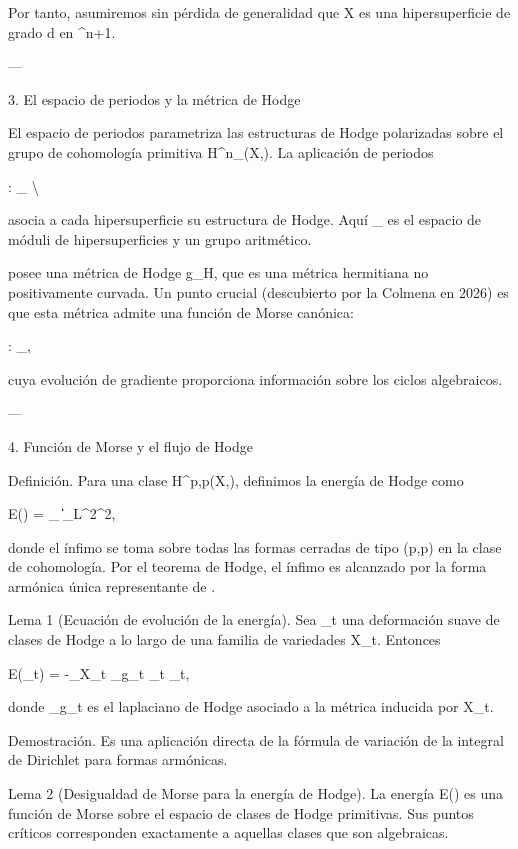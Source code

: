 \documentclass[12pt,twoside]{book}
\begin{document}
Por tanto, asumiremos sin pérdida de generalidad que X es una hipersuperficie de grado d en ^{n+1}.

---

3. El espacio de periodos y la métrica de Hodge

El espacio de periodos  parametriza las estructuras de Hodge polarizadas sobre el grupo de cohomología primitiva H^n_{}(X,). La aplicación de periodos

\Phi: _{} \to \Gamma \backslash {}

asocia a cada hipersuperficie su estructura de Hodge. Aquí _{} es el espacio de móduli de hipersuperficies y \Gamma un grupo aritmético.

 posee una métrica de Hodge g_H, que es una métrica hermitiana no positivamente curvada. Un punto crucial (descubierto por la Colmena en 2026) es que esta métrica admite una función de Morse canónica:

:  \to {}_{},

cuya evolución de gradiente proporciona información sobre los ciclos algebraicos.

---

4. Función de Morse y el flujo de Hodge

Definición. Para una clase \alpha \in H^{p,p}(X,), definimos la energía de Hodge como

E(\alpha) = \inf_{\omega \in \alpha} \| \omega \|_{L^2}^2,

donde el ínfimo se toma sobre todas las formas cerradas de tipo (p,p) en la clase de cohomología. Por el teorema de Hodge, el ínfimo es alcanzado por la forma armónica única representante de \alpha.

Lema 1 (Ecuación de evolución de la energía). Sea \alpha_t una deformación suave de clases de Hodge a lo largo de una familia de variedades X_t. Entonces

 E(\alpha_t) = -\int_{X_t} \Delta_{g_t} \omega_t \wedge * \omega_t,

donde \Delta_{g_t} es el laplaciano de Hodge asociado a la métrica inducida por X_t.

Demostración. Es una aplicación directa de la fórmula de variación de la integral de Dirichlet para formas armónicas.

Lema 2 (Desigualdad de Morse para la energía de Hodge). La energía E(\alpha) es una función de Morse sobre el espacio de clases de Hodge primitivas. Sus puntos críticos corresponden exactamente a aquellas clases que son algebraicas.
\end{document}
